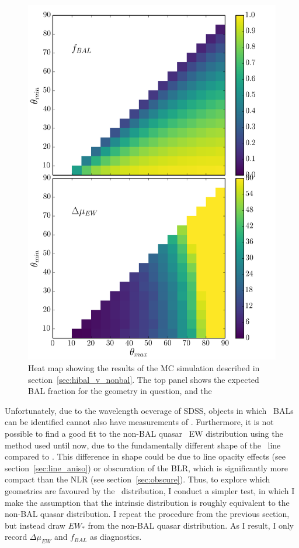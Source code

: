 \begin{figure} %
\centering
\includegraphics[width=1.0\textwidth]{figures/ewpaper/faceon_ew_c4_faceon_sdss.png}
\caption
{
Heat map showing the results of the MC simulation described in 
section~\ref{sec:hibal_v_nonbal}. The top panel shows the expected 
BAL fraction for the geometry in question, and the 
}
\label{fig:c4_faceon}
\end{figure} %

Unfortunately, due to the wavelength ocverage of SDSS, objects in 
which \civ\ BALs can be identified cannot also have measurements of \ewo. 
Furthermore, it is not possible to find a good fit to 
the non-BAL quasar \civline\ EW distribution using the method used until
now, due to the fundamentally different shape of the \civ\ line compared to
\oiii. This difference in shape could be due to line opacity effects 
(see section~\ref{sec:line_aniso}) or obscuration of the BLR, which is significantly
more compact than the NLR (see section~\ref{sec:obscure}).
Thus, to explore which geometries are favoured by the \civ\ distribution,
I conduct a simpler test, in which I make the assumption that the intrinsic
distribution is roughly equivalent to the non-BAL quasar distribution.
I repeat the procedure from the previous section, but instead draw $EW_*$
from the non-BAL quasar distribution. As I result, I only record $\Delta \mu_{EW}$
and $f_{BAL}$ as diagnostics. 

